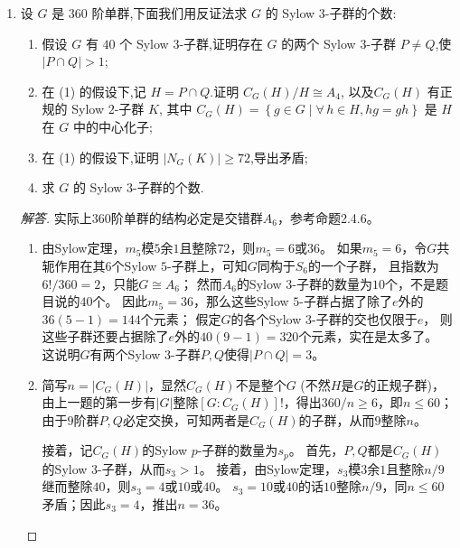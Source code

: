 \begin{enumerate}
\begin{proof}
    $G$通过左乘可迁地作用在$G/N$上，带来了同态$\rho:G \to S_5$，
    可知$\ker\rho=\{e\}$，这样$G$同构于$S_5$的子群，且指数为$5!/60=2$，
    从而其为正规子群 (第3节例3的(1))，只能是$A_5$。
\end{proof}
\item 设 $G$ 是 $360$ 阶单群,下面我们用反证法求 $G$ 的 Sylow $3$-子群的个数:
\begin{enumerate}[label=(\arabic*)]
\item 假设 $G$ 有 $40$ 个 Sylow $3$-子群,证明存在 $G$ 的两个 Sylow $3$-子群 $P \neq Q$,使 $|P \cap Q| > 1$;
\item 在 (1) 的假设下,记 $H = P \cap Q$.证明 $C_G(H)/H \cong A_4$, 以及$C_{G}(H)$ 有正规的 Sylow $2$-子群 $K$,
其中 $C_{G}(H) = \left\{g \in G \mid \forall\,h \in H, hg = gh\right\}$ 是 $H$ 在 $G$ 中的中心化子;
\item 在 (1) 的假设下,证明 $|N_{G}(K)| \geqslant 72$,导出矛盾;
\item 求 $G$ 的 Sylow $3$-子群的个数.
\end{enumerate}
\begin{proof}[解答]
    实际上$360$阶单群的结构必定是交错群$A_6$，参考\cite{Wa}命题2.4.6。
    \begin{enumerate}[label=(\arabic*)]
    \item 由Sylow定理，$m_5$模$5$余$1$且整除$72$，则$m_5=6$或$36$。
    如果$m_5=6$，令$G$共轭作用在其$6$个Sylow $5$-子群上，可知$G$同构于$S_6$的一个子群，
    且指数为$6!/360=2$，只能$G \cong A_6$；
    然而$A_6$的Sylow $3$-子群的数量为$10$个，不是题目说的$40$个。
    因此$m_5=36$，那么这些Sylow $5$-子群占据了除了$e$外的$36(5-1)=144$个元素；
    假定$G$的各个Sylow $3$-子群的交也仅限于$e$，
    则这些子群还要占据除了$e$外的$40(9-1)=320$个元素，实在是太多了。
    这说明$G$有两个Sylow $3$-子群$P,Q$使得$|P \cap Q|=3$。
    \item 简写$n=|C_G(H)|$，显然$C_G(H)$不是整个$G$ (不然$H$是$G$的正规子群)，
    由上一题的第一步有$|G|$整除$[G:C_G(H)]!$，得出$360/n\geqslant6$，即$n\leqslant60$；
    由于$9$阶群$P,Q$必定交换，可知两者是$C_G(H)$的子群，从而$9$整除$n$。

    接着，记$C_G(H)$的Sylow $p$-子群的数量为$s_p$。
    首先，$P,Q$都是$C_G(H)$的Sylow $3$-子群，从而$s_3>1$。
    接着，由Sylow定理，$s_3$模$3$余$1$且整除$n/9$继而整除$40$，则$s_3=4$或$10$或$40$。
    $s_3=10$或$40$的话$10$整除$n/9$，同$n\leqslant60$矛盾；因此$s_3=4$，推出$n=36$。


\end{enumerate}
\end{proof}
\end{enumerate}
